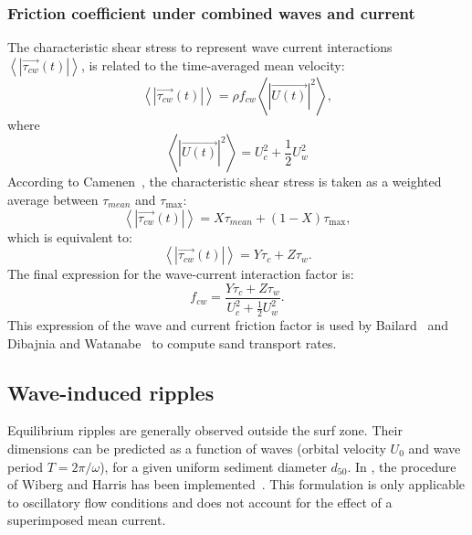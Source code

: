 \subsubsection{Friction coefficient under combined waves and current}
The characteristic shear stress to represent wave current interactions $\left\langle \left| \overrightarrow{\tau_{cw}} (t)\right| \right\rangle$, is related to the time-averaged mean velocity:
\begin{equation*}
\left\langle \left| \overrightarrow{\tau_{cw}} (t)\right| \right\rangle
=\rho f_{cw} \left\langle \left| \overrightarrow{U(t)} \right|^2
\right\rangle, 
\end{equation*}
where
\begin{equation*}
\left\langle \left| \overrightarrow{U(t)} \right|^2 \right\rangle =U_c^2 +\frac{1}{2} U_w^2 
\end{equation*}
According to Camenen~\cite{Camenen}, the characteristic shear stress is taken as a weighted average between $\tau_{mean}$ and $\tau_{\max}$:
\begin{equation*}
\left\langle \left| \overrightarrow{\tau_{cw}} (t)\right| \right\rangle
 = X\tau_{mean} + (1-X)\tau_{\max}, 
\end{equation*}
which is equivalent to:
\begin{equation*}
\left\langle \left| \overrightarrow{\tau_{cw}} (t)\right| \right\rangle
 = Y\tau_c + Z\tau_w. 
\end{equation*}
The final expression for the wave-current interaction factor is:
\begin{equation}\label{eq:fcw}
f_{cw} = \frac{Y\tau_c + Z\tau_w}{{U_c^2} + \frac{1}{2}{U_w^2}}. 
\end{equation}
This expression of the wave and current friction factor is used by Bailard~\cite{13} and Dibajnia and Watanabe~\cite{Dibajnia} to compute sand transport rates.

\subsection{Wave-induced ripples}
Equilibrium ripples are generally observed outside the surf zone. Their
dimensions can be predicted as a function of waves (orbital velocity $U_0$
and wave period $T=2\pi/\omega$), for a given uniform sediment diameter $d_{50}$. 
In \sisyphe, the procedure of Wiberg and Harris has been implemented~\cite{Wiberg}. This formulation is only applicable to oscillatory flow conditions and does not account for the effect of a superimposed mean current.

